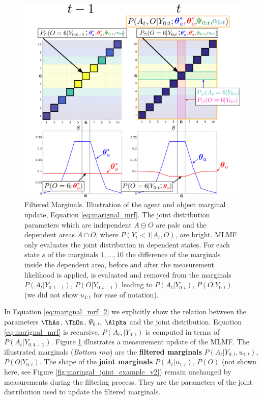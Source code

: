\begin{figure}
\centering
\includegraphics[width=\textwidth]{./ch5-MLMF/Figures/explenation/marginal_cal_example_v2.pdf}
\caption{Filtered Marginals. Illustration of the agent and object marginal update, Equation \ref{eq:marignal_mrf}. The joint 
distribution parameters which are independent $A \ominus O$ are pale and the dependent areas $A \cap O$, where $P(Y_t<1|A_t,O)$, are bright. MLMF only
evaluates the joint distribution in dependent states. For each state $s$ of the marginals $1,\dots,10$ the difference 
of the marginals inside the dependent area, before and after the measurement likelihood is applied, is evaluated and removed from the marginals 
$P(A_t|Y_{0:t-1})$, $P(O|Y_{0:t-1})$ leading to $P(A_t|Y_{0:t})$, $P(O|Y_{0:t})$ (we did not show $u_{1:t}$ for ease of notation). }
\label{fig:ch5:marginal_update}
\end{figure}

In Equation \ref{eq:marignal_mrf_2} we explicitly show the relation between the parameters $\ThAs$, $\ThOs$, $\Psi_{0:t}$, $\Alpha$ and the joint
distribution. Equation \ref{eq:marignal_mrf} is recursive, $P(A_t,|Y_{0:\mathbf{t}})$ is computed in terms of $P(A_t|Y_{0:\mathbf{t-1}})$. 
Figure \ref{fig:ch5:marginal_update} illustrates a measurement update of the MLMF.
The illustrated marginals (\textit{Bottom row}) are the \textbf{filtered marginals} $P(A_t|Y_{0:t},u_{1:t})$, $P(O|Y_{0:t})$. The shape 
of the \textbf{joint marginals} $P(A_t|u_{1:t})$, $P(O)$
(not shown here, see Figure \ref{fig:maringal_joint_example_v2}) remain unchanged by measurements during the filtering process. They are the parameters of the joint distribution used to 
update the filtered marginals.


